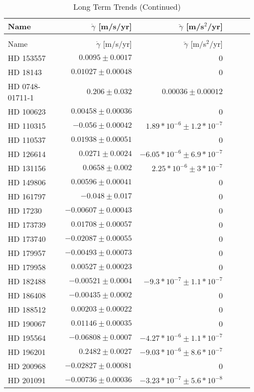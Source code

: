 \begin{longtable*}{lrrrrr}
\caption{Long Term Trends} \\
\toprule 
\midrule 

Name & $\dot \gamma$ [m/s/yr] & $\ddot \gamma$ [m/s$^2$/yr] \\ 
\toprule 
\endfirsthead 
\caption[]{Long Term Trends (Continued)} \\
\toprule 
\midrule 
Name & $\dot \gamma$ [m/s/yr] & $\ddot \gamma$ [m/s$^2$/yr] \\ 
\toprule 
\endhead 
HD 153557 & $0.0095\pm 0.0017$ & 0 \\ 
HD 18143 & $0.01027\pm 0.00048$ & 0 \\ 
HD 0748-01711-1 & $0.206\pm 0.032$ & $0.00036\pm 0.00012$ \\ 
HD 100623 & $0.00458\pm 0.00036$ & 0 \\ 
HD 110315 & $-0.056\pm 0.00042$ & $1.89*10^{-6}\pm 1.2*10^{-7}$ \\ 
HD 110537 & $0.01938\pm 0.00051$ & 0 \\ 
HD 126614 & $0.0271\pm 0.0024$ & $-6.05*10^{-6}\pm 6.9*10^{-7}$ \\ 
HD 131156 & $0.0658\pm 0.002$ & $2.25*10^{-6}\pm 3*10^{-7}$ \\ 
HD 149806 & $0.00596\pm 0.00041$ & 0 \\ 
HD 161797 & $-0.048\pm 0.017$ & 0 \\ 
HD 17230 & $-0.00607\pm 0.00043$ & 0 \\ 
HD 173739 & $0.01708\pm 0.00057$ & 0 \\ 
HD 173740 & $-0.02087\pm 0.00055$ & 0 \\ 
HD 179957 & $-0.00493\pm 0.00073$ & 0 \\ 
HD 179958 & $0.00527\pm 0.00023$ & 0 \\ 
HD 182488 & $-0.00521\pm 0.0004$ & $-9.3*10^{-7}\pm 1.1*10^{-7}$ \\ 
HD 186408 & $-0.00435\pm 0.0002$ & 0 \\ 
HD 188512 & $0.00203\pm 0.00022$ & 0 \\ 
HD 190067 & $0.01146\pm 0.00035$ & 0 \\ 
HD 195564 & $-0.06808\pm 0.0007$ & $-4.27*10^{-6}\pm 1.1*10^{-7}$ \\ 
HD 196201 & $0.2482\pm 0.0027$ & $-9.03*10^{-6}\pm 8.6*10^{-7}$ \\ 
HD 200968 & $-0.02827\pm 0.00081$ & 0 \\ 
HD 201091 & $-0.00736\pm 0.00036$ & $-3.23*10^{-7}\pm 5.6*10^{-8}$ \\ 

\end{longtable*}
